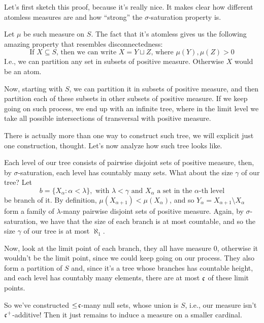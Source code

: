 \begin{sketch}
    Let's first sketch this proof, because it's really nice. It makes clear how different atomless measures are and how ``strong'' the $\sigma$-saturation property is.

    Let $\mu$ be such measure on $S$. The fact that it's atomless gives us the following amazing property that resembles disconnectedness:
    $$\text{If $X\subseteq S$, then we can write $X=Y\sqcup Z$, where $\mu(Y),\mu(Z)>0$}$$
    I.e., we can partition any set in subsets of positive measure. Otherwise $X$ would be an atom.

    Now, starting with $S$, we can partition it in subsets of positive measure, and then partition each of these subsets in other subsets of positive measure. If we keep going on such process, we end up with an infinite tree, where in the limit level we take all possible intersections of transversal with positive measure. 
    
    There is actually more than one way to construct such tree, we will explicit just one construction, thought. Let's now analyze how such tree looks like.

    Each level of our tree consists of pairwise disjoint sets of positive measure, then, by $\sigma$-saturation, each level has countably many sets. What about the size $\gamma$ of our tree? Let 
    $$b=\{X_\alpha:\alpha<\lambda\},\text{ with }\lambda<\gamma\text{ and }X_\alpha\text{ a set in the $\alpha$-th level}$$
    be branch of it. By definition, $\mu(X_{\alpha+1})<\mu(X_\alpha)$, and so $Y_\alpha=X_{\alpha+1}\setminus X_\alpha$ form a family of $\lambda$-many pairwise disjoint sets of positive measure. Again, by $\sigma$-saturation, we have that the size of each branch is at most countable, and so the size $\gamma$ of our tree is at most $\aleph_1$.

    Now, look at the limit point of each branch, they all have measure 0, otherwise it wouldn't be the limit point, since we could keep going on our process. They also form a partition of $S$ and, since it's a tree whose branches has countable height, and each level has countably many elements, there are at most $\mathfrak{c}$ of these limit points.

    So we've constructed $\leq\!\mathfrak{c}$-many null sets, whose union is $S$, i.e., our measure isn't $\mathfrak{c}^+$-additive! Then it just remains to induce a measure on a smaller cardinal.
\end{sketch}


